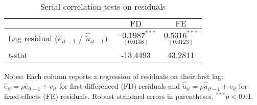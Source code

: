 \begin{table}[H]
\centering
\caption{Serial correlation tests on residuals}
\label{tab:autocorr_tests}
\begin{tabular}{lcc}
\hline
 & $\text{FD}$ & $\text{FE}$ \\
\hline
Lag residual ($\hat{e}_{it-1}$ / $\hat{\ddot{u}}_{it-1}$)
  & $\underset{(0.0148)}{-0.1987^{***}}$
  & $\underset{(0.0123)}{0.5316^{***}}$ \\
$t$-stat & -13.4493 & 43.2811 \\
\hline
\end{tabular}

\begin{flushleft}\footnotesize
Notes: Each column reports a regression of residuals on their first lag:
$\hat{e}_{it}=\rho \hat{e}_{it-1}+v_{it}$ for first-differenced (FD) residuals and
$\hat{\ddot{u}}_{it}=\rho \hat{\ddot{u}}_{it-1}+v_{it}$ for fixed-effects (FE) residuals.
Robust standard errors in parentheses. ${}^{***}p<0.01$.
\end{flushleft}
\end{table}
